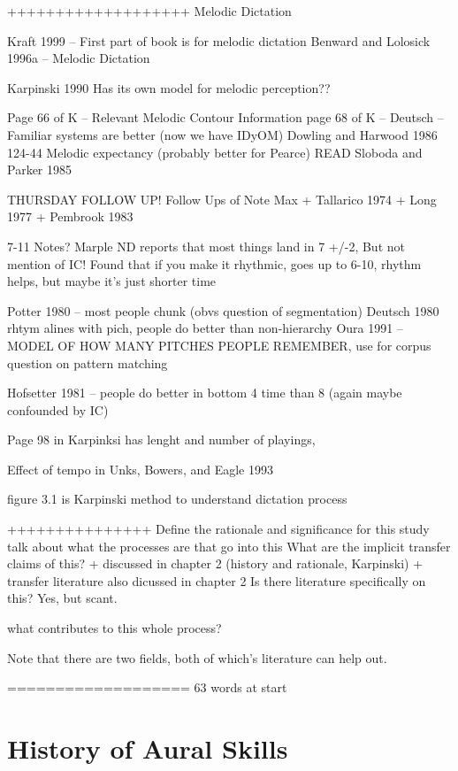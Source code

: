 \documentclass[]{book}
\theoremstyle{definition}
\theoremstyle{definition}
\theoremstyle{definition}
\theoremstyle{remark}
\begin{document}
+++++++++++++++++++ Melodic Dictation

Kraft 1999 -- First part of book is for melodic dictation Benward and
Lolosick 1996a -- Melodic Dictation

Karpinski 1990 Has its own model for melodic perception??

Page 66 of K -- Relevant Melodic Contour Information page 68 of K --
Deutsch -- Familiar systems are better (now we have IDyOM) Dowling and
Harwood 1986 124-44 Melodic expectancy (probably better for Pearce) READ
Sloboda and Parker 1985

THURSDAY FOLLOW UP! Follow Ups of Note Max + Tallarico 1974 + Long 1977
+ Pembrook 1983

7-11 Notes? Marple ND reports that most things land in 7 +/-2, But not
mention of IC! Found that if you make it rhythmic, goes up to 6-10,
rhythm helps, but maybe it's just shorter time

Potter 1980 -- most people chunk (obvs question of segmentation) Deutsch
1980 rhtym alines with pich, people do better than non-hierarchy Oura
1991 -- MODEL OF HOW MANY PITCHES PEOPLE REMEMBER, use for corpus
question on pattern matching

Hofsetter 1981 -- people do better in bottom 4 time than 8 (again maybe
confounded by IC)

Page 98 in Karpinksi has lenght and number of playings,

Effect of tempo in Unks, Bowers, and Eagle 1993

figure 3.1 is Karpinski method to understand dictation process

+++++++++++++++ Define the rationale and significance for this study
talk about what the processes are that go into this What are the
implicit transfer claims of this? + discussed in chapter 2 (history and
rationale, Karpinski) + transfer literature also dicussed in chapter 2
Is there literature specifically on this? Yes, but scant.

what contributes to this whole process?

Note that there are two fields, both of which's literature can help out.

=================== 63 words at start

\hypertarget{history-of-aural-skills}{%
\chapter{History of Aural Skills}\label{history-of-aural-skills}}
\end{document}
